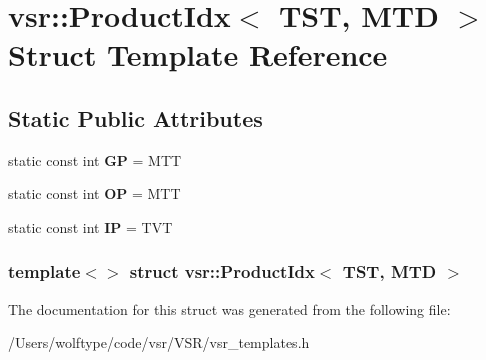 \hypertarget{structvsr_1_1_product_idx_3_01_t_s_t_00_01_m_t_d_01_4}{\section{vsr\-:\-:Product\-Idx$<$ T\-S\-T, M\-T\-D $>$ Struct Template Reference}
\label{structvsr_1_1_product_idx_3_01_t_s_t_00_01_m_t_d_01_4}
}
\subsection*{Static Public Attributes}
\begin{DoxyCompactItemize}
\item 
\hypertarget{structvsr_1_1_product_idx_3_01_t_s_t_00_01_m_t_d_01_4_a61c658daaccc343a3fccfbd18e5e2287}{static const int {\bfseries G\-P} = M\-T\-T}\label{structvsr_1_1_product_idx_3_01_t_s_t_00_01_m_t_d_01_4_a61c658daaccc343a3fccfbd18e5e2287}

\item 
\hypertarget{structvsr_1_1_product_idx_3_01_t_s_t_00_01_m_t_d_01_4_aee2c67ce21ef543c849b48181c5ae06d}{static const int {\bfseries O\-P} = M\-T\-T}\label{structvsr_1_1_product_idx_3_01_t_s_t_00_01_m_t_d_01_4_aee2c67ce21ef543c849b48181c5ae06d}

\item 
\hypertarget{structvsr_1_1_product_idx_3_01_t_s_t_00_01_m_t_d_01_4_acb718d6c14ef53520df0ee79f222f5e4}{static const int {\bfseries I\-P} = T\-V\-T}\label{structvsr_1_1_product_idx_3_01_t_s_t_00_01_m_t_d_01_4_acb718d6c14ef53520df0ee79f222f5e4}

\end{DoxyCompactItemize}
\subsubsection*{template$<$$>$ struct vsr\-::\-Product\-Idx$<$ T\-S\-T, M\-T\-D $>$}



The documentation for this struct was generated from the following file\-:\begin{DoxyCompactItemize}
\item 
/\-Users/wolftype/code/vsr/\-V\-S\-R/vsr\-\_\-templates.\-h\end{DoxyCompactItemize}

